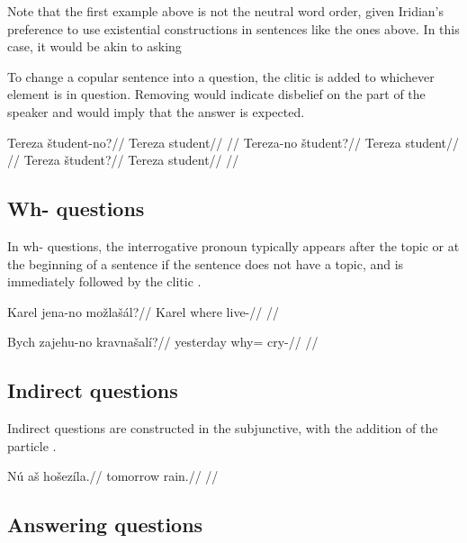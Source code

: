 Note that the first example above is not the neutral word order, given Iridian's preference to use existential constructions in sentences like the ones above. In this case, it would be akin to asking 

To change a copular sentence into a question, the clitic  is added to whichever element is in question. Removing  would indicate disbelief on the part of the speaker and would imply that the answer  is expected.

\pex
\a
\begingl
\gla Tereza \v{s}tudent-no?//
\glb Tereza student//
\glft {}//
\endgl
\a
\begingl
\gla Tereza-no \v{s}tudent?//
\glb Tereza student//
\glft {}//
\endgl
\a
\begingl
\gla Tereza \v{s}tudent?//
\glb Tereza student//
\glft {}//
\endgl
\xe

\subsection{Wh- questions}
In wh- questions, the interrogative pronoun typically appears after the topic or at the beginning of a sentence if the sentence does not have a topic, and is immediately followed by the clitic .

\pex
\begingl
\gla Karel jena-no mo\v{z}la\v{s}\'al?//
\glb Karel where live-//
\glft {}//
\endgl
\xe

\pex
\begingl
\gla Bych zajehu-no kravna\v{s}al\'i?//
\glb yesterday why= cry-//
\glft {}//
\endgl
\xe

\subsection{Indirect questions}

Indirect questions are constructed in the subjunctive, with the addition of the particle .

\pex
\begingl
\gla N\'u a\v{s} ho\v{s}ez\'ila.//
\glb tomorrow  rain.//
\glft {}//
\endgl
\xe

\subsection{Answering questions}

